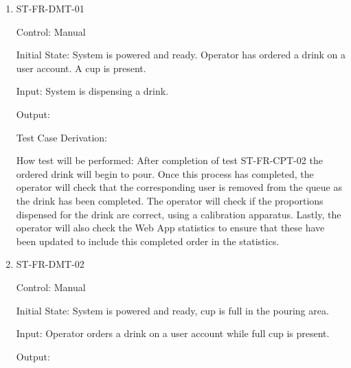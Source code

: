 \documentclass[12pt, titlepage]{article}
\begin{document}
\begin{enumerate}

\item{ST-FR-DMT-01\\}

Control: Manual
					
Initial State: System is powered and ready. Operator has ordered a drink on a user account. A cup is present.
					
Input: System is dispensing a drink.
					
Output: 

Test Case Derivation: 
					
How test will be performed: After completion of test ST-FR-CPT-02 the ordered drink will begin to pour. Once this process has completed, the operator will check that the corresponding user is removed from the queue as the drink has been completed. The operator will check if the proportions dispensed for the drink are correct, using a calibration apparatus. Lastly, the operator will also check the Web App statistics to ensure that these have been updated to include this completed order in the statistics.

\item{ST-FR-DMT-02\\}

Control: Manual

Initial State: System is powered and ready, cup is full in the pouring area.

Input: Operator orders a drink on a user account while full cup is present.

Output: 


\end{enumerate}
\end{document}
